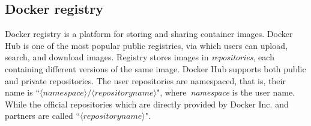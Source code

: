 









\subsection{Docker registry}

Docker registry is a platform for storing and sharing container
images. Docker Hub is one of the most popular public registries,
via which users can upload, search, and download images.
%
%
%
%
%
%
Registry stores images in \emph{repositories},
each containing different versions of the same image.
Docker Hub supports both public and
private repositories.
The user repositories are namespaced, that is, their name is
``$\langle namespace\rangle/\langle repository name \rangle$",
where~\textit{namespace} is the user name. While the official repositories which
are directly provided by Docker Inc. and partners are called
``$\langle repository name \rangle$".
%



